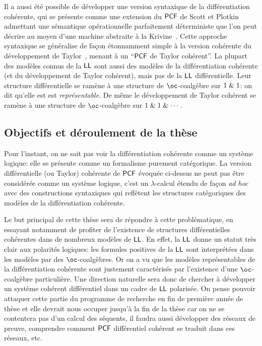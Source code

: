 \documentclass[a4]{article}
\begin{document}
Il a aussi été possible de développer une version syntaxique de la
diffé\-ren\-tia\-tion cohérente, qui se présente comme une extension du
$\mathsf{PCF}$ de Scott et Plotkin admettant une sémantique
opérationnelle parfaitement déterministe que l'on peut décrire au
moyen d'une machine abstraite à la Krivine~\cite{Ehrhard23b}.
%
Cette approche syntaxique se généralise de façon étonnamment simple à
la version cohérente du développement de
Taylor~\cite{EhrhardWalch23b}, menant à un ``$\mathsf{PCF}$ de Taylor
cohérent''.
%
La plupart des modèles connus de la $\hbox{\textsf{LL}}$ sont aussi des modèles de la
différentiation cohérente (et du développement de Taylor cohérent),
mais pas de la $\hbox{\textsf{LL}}$ différentielle.
%
Leur structure différentielle se ramène à une structure de
$\oc$-coalgèbre sur ${1}\mathrel{\&}{1}$: on dit qu'elle est
est \emph{représentable}.
%
De même le développement de Taylor cohérent se ramène à une structure
de $\oc$-coalgèbre sur $1\mathrel{\&}1\mathrel{\&}\cdots$.

\subsection*{Objectifs et déroulement de la thèse}
Pour l'instant, on ne sait pas voir la différentiation cohérente comme
un système logique: elle se présente comme un formalisme purement
catégorique.
%
La version différentielle (ou Taylor) cohérente de $\mathsf{PCF}$ évoquée
ci-dessus ne peut pas être considérée comme un système logique, c'est
un $\lambda$-calcul étendu de façon \emph{ad hoc} avec des
constructions syntaxiques qui reflètent les structures catégoriques
des modèles de la différentiation cohérente.

Le but principal de cette thèse sera de répondre à cette
problématique, en essayant notamment de profiter de l'existence de
structures différentielles cohérentes dans de nombreux modèles de
$\hbox{\textsf{LL}}$.
%
En effet, la $\hbox{\textsf{LL}}$ donne un statut très clair aux polarités logiques:
les formules positives de la $\hbox{\textsf{LL}}$ sont interprétées dans les modèles
par des $\oc$-coalgèbres.
%
Or on a vu que les modèles représentables de la différentiation
cohérente sont justement caractérisés par l'existence d'une
$\oc$-coalgèbre particulière.
%
Une direction naturelle sera donc de chercher à développer un système
cohérent différentiel dans un cadre de $\hbox{\textsf{LL}}$ polarisée.
%
On pense pouvoir attaquer cette partie du programme de recherche en
fin de première année de thèse et elle devrait nous occuper jusqu'à la
fin de la thèse car on ne se contentera pas d'un calcul des séquents,
il faudra aussi développer des réseaux de preuve, comprendre comment
$\mathsf{PCF}$ différentiel cohérent se traduit dans ces réseaux, etc.
\end{document}
